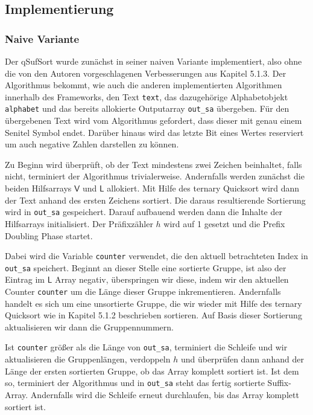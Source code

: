 \subsection{Implementierung}
\subsubsection{Naive Variante}
Der qSufSort wurde zunächst in seiner naiven Variante implementiert, also ohne die von den Autoren vorgeschlagenen Verbesserungen aus Kapitel 5.1.3. Der Algorithmus bekommt, wie auch die anderen implementierten Algorithmen innerhalb des Frameworks, den Text \texttt{text}, das dazugehörige Alphabetobjekt \texttt{alphabet} und das bereits allokierte Outputarray \texttt{out_sa} übergeben. Für den übergebenen Text wird vom Algorithmus gefordert, dass dieser mit genau einem Senitel Symbol endet. Darüber hinaus wird das letzte Bit eines Wertes reserviert um auch negative Zahlen darstellen zu können.

Zu Beginn wird überprüft, ob der Text mindestens zwei Zeichen beinhaltet, falls nicht, terminiert der Algorithmus trivialerweise. Andernfalls werden zunächst die beiden Hilfsarrays $\mathsf{V}$ und $\mathsf{L}$ allokiert. Mit Hilfe des ternary Quicksort wird dann der Text anhand des ersten Zeichens sortiert. Die daraus resultierende Sortierung wird in \texttt{out_sa} gespeichert. Darauf aufbauend werden dann die Inhalte der Hilfsarrays initialisiert. Der Präfixzähler $h$ wird auf 1 gesetzt und die Prefix Doubling Phase startet. 

Dabei wird die Variable \texttt{counter} verwendet, die den aktuell betrachteten Index in \texttt{out_sa} speichert. Beginnt an dieser Stelle eine sortierte Gruppe, ist also der Eintrag im $\mathsf{L}$ Array negativ, überspringen wir diese, indem wir den aktuellen Counter \texttt{counter} um die Länge dieser Gruppe inkrementieren. Andernfalls handelt es sich um eine unsortierte Gruppe, die wir wieder mit Hilfe des ternary Quicksort wie in Kapitel 5.1.2 beschrieben sortieren. Auf Basis dieser Sortierung aktualisieren wir dann die Gruppennummern.

Ist \texttt{counter} größer als die Länge von \texttt{out_sa}, terminiert die Schleife und wir aktualisieren die Gruppenlängen, verdoppeln $h$ und überprüfen dann anhand der Länge der ersten sortierten Gruppe, ob das Array komplett sortiert ist. Ist dem so, terminiert der Algorithmus und in \texttt{out_sa} steht das fertig sortierte Suffix-Array. Andernfalls wird die Schleife erneut durchlaufen, bis das Array komplett sortiert ist.

